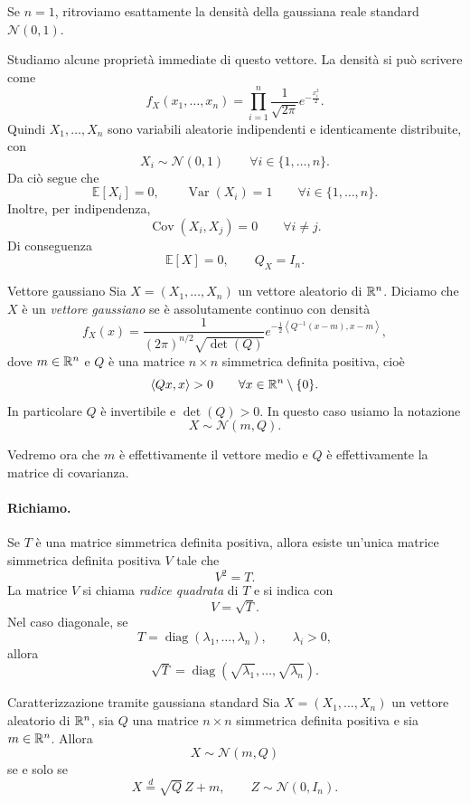 \documentclass[a4paper]{article}
\begin{document}
Se \(n=1\), ritroviamo esattamente la densità della gaussiana reale standard
\(\mathcal N(0,1)\).

Studiamo alcune proprietà immediate di questo vettore. La densità si può scrivere come
\[
    f_X(x_1,\ldots,x_n)
    =
    \prod_{i=1}^n
    \frac{1}{\sqrt{2\pi}}
    e^{-\frac{x_i^2}{2}}.
\]
Quindi \(X_1,\ldots,X_n\) sono variabili aleatorie indipendenti e identicamente distribuite, con
\[
    X_i\sim\mathcal N(0,1)
    \qquad
    \forall i\in\{1,\ldots,n\}.
\]
Da ciò segue che
\[
    \mathbb E[X_i]=0,
    \qquad
    \operatorname{Var}(X_i)=1
    \qquad
    \forall i\in\{1,\ldots,n\}.
\]
Inoltre, per indipendenza,
\[
    \operatorname{Cov}(X_i,X_j)=0
    \qquad
    \forall i\neq j.
\]
Di conseguenza
\[
    \mathbb E[X]=0,
    \qquad
    Q_X=I_n.
\]

\begin{snippetdefinition}{Vettore gaussiano}
    Sia \(X=(X_1,\ldots,X_n)\) un vettore aleatorio di \(\mathbb{R}^n\).
    Diciamo che \(X\) è un \emph{vettore gaussiano} se è assolutamente continuo con densità
    \[
        f_X(x)
        =
        \frac{1}{(2\pi)^{n/2}\sqrt{\det(Q)}}
        e^{-\frac12\left\langle Q^{-1}(x-m),x-m\right\rangle},
    \]
    dove \(m\in\mathbb{R}^n\) e \(Q\) è una matrice \(n\times n\) simmetrica definita positiva, cioè
    \[
        \left\langle Qx,x\right\rangle>0
        \qquad
        \forall x\in\mathbb{R}^n\setminus\{0\}.
    \]
    In particolare \(Q\) è invertibile e \(\det(Q)>0\).
    In questo caso usiamo la notazione
    \[
        X\sim\mathcal N(m,Q).
    \]
\end{snippetdefinition}

Vedremo ora che \(m\) è effettivamente il vettore medio e \(Q\) è effettivamente la matrice di covarianza.

\paragraph{Richiamo.}
Se \(T\) è una matrice simmetrica definita positiva, allora esiste un'unica matrice simmetrica definita positiva \(V\) tale che
\[
    V^2=T.
\]
La matrice \(V\) si chiama \emph{radice quadrata} di \(T\) e si indica con
\[
    V=\sqrt T.
\]
Nel caso diagonale, se
\[
    T=\operatorname{diag}(\lambda_1,\ldots,\lambda_n),
    \qquad
    \lambda_i>0,
\]
allora
\[
    \sqrt T
    =
    \operatorname{diag}(\sqrt{\lambda_1},\ldots,\sqrt{\lambda_n}).
\]

\begin{snippettheorem}{Caratterizzazione tramite gaussiana standard}
    Sia \(X=(X_1,\ldots,X_n)\) un vettore aleatorio di \(\mathbb{R}^n\), sia \(Q\) una matrice \(n\times n\) simmetrica definita positiva e sia \(m\in\mathbb{R}^n\).
    Allora
    \[
        X\sim\mathcal N(m,Q)
    \]
    se e solo se
    \[
        X\stackrel{d}{=}\sqrt Q\,Z+m,
        \qquad
        Z\sim\mathcal N(0,I_n).
    \]
\end{snippettheorem}
\end{document}
